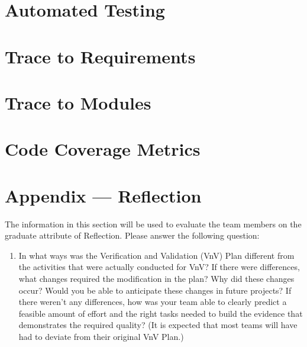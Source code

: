 \documentclass[12pt, titlepage]{article}
\begin{document}
\section{Automated Testing}
		
\section{Trace to Requirements}
		
\section{Trace to Modules}		

\section{Code Coverage Metrics}




\newpage{}
\section*{Appendix --- Reflection}

The information in this section will be used to evaluate the team members on the
graduate attribute of Reflection.  Please answer the following question:

\begin{enumerate}
  \item In what ways was the Verification and Validation (VnV) Plan different
  from the activities that were actually conducted for VnV?  If there were
  differences, what changes required the modification in the plan?  Why did
  these changes occur?  Would you be able to anticipate these changes in future
  projects?  If there weren't any differences, how was your team able to clearly
  predict a feasible amount of effort and the right tasks needed to build the
  evidence that demonstrates the required quality?  (It is expected that most
  teams will have had to deviate from their original VnV Plan.)
\end{enumerate}
\end{document}
